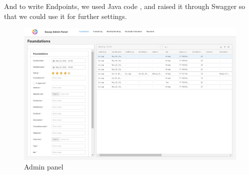 And to write Endpoints, we used Java code \cite{Java}, and raised it through Swagger so that we could use it for further settings.


\begin{figure}[h]
    \centering
    \includegraphics[width=13cm]{figures/adminPanel.png}
    \caption{Admin panel}
    \label{fig:14}
\end{figure}

